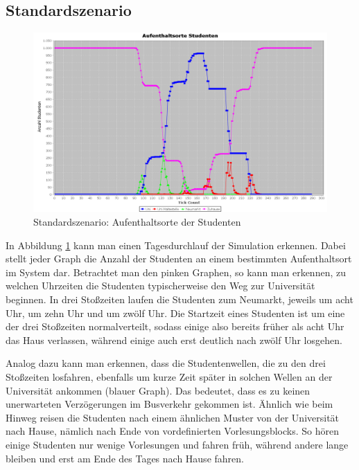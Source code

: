 \documentclass[12pt,a4paper]{scrartcl}
\begin{document}

\subsection{Standardszenario}\label{s1}
\begin{figure}
\includegraphics[scale=0.4]{Standardszenario_Aufenthaltsorte.png}
\caption{Standardszenario: Aufenthaltsorte der Studenten}
\label{s1g1}
\end{figure}

In Abbildung \ref{s1g1} kann man einen Tagesdurchlauf der Simulation erkennen. Dabei stellt jeder Graph die Anzahl der Studenten an einem bestimmten Aufenthaltsort im System dar. Betrachtet man den pinken Graphen, so kann man erkennen, zu welchen Uhrzeiten die Studenten typischerweise den Weg zur Universität beginnen. In drei Stoßzeiten laufen die Studenten zum Neumarkt, jeweils um acht Uhr, um zehn Uhr und um zwölf Uhr. Die Startzeit eines Studenten ist um eine der drei Stoßzeiten normalverteilt, sodass einige also bereits früher als acht Uhr das Haus verlassen, während einige auch erst deutlich nach zwölf Uhr losgehen. 

Analog dazu kann man erkennen, dass die Studentenwellen, die zu den drei Stoßzeiten losfahren, ebenfalls um kurze Zeit später in solchen Wellen an der Universität ankommen (blauer Graph). Das bedeutet, dass es zu keinen unerwarteten Verzögerungen im Busverkehr gekommen ist. Ähnlich wie beim Hinweg reisen die Studenten nach einem ähnlichen Muster von der Universität nach Hause, nämlich nach Ende von vordefinierten Vorlesungsblocks. So hören einige Studenten nur wenige Vorlesungen und fahren früh, während andere lange bleiben und erst am Ende des Tages nach Hause fahren. 
\end{document}
